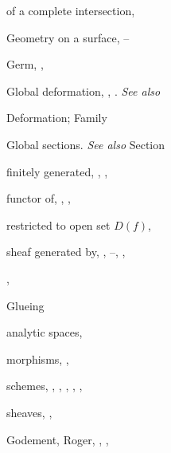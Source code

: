 {{\noindent\hspace*{7.5bp}of a complete intersection, \par
\noindent\hspace*{0.0bp}Geometry on a surface, --\par
\noindent\hspace*{0.0bp}Germ, , \par
\noindent\hspace*{0.0bp}Global deformation, , . \emph{See also}\par
\noindent\hspace*{15.0bp}Deformation; Family\par
\noindent\hspace*{0.0bp}Global sections. \emph{See also} Section\par
\noindent\hspace*{7.5bp}finitely generated, , , \par
\noindent\hspace*{7.5bp}functor of, , , \par
\noindent\hspace*{7.5bp}restricted to open set $D(f)$, \par
\noindent\hspace*{7.5bp}sheaf generated by, , --, ,\par
\noindent\hspace*{15.0bp}, \par
\noindent\hspace*{0.0bp}Glueing\par
\noindent\hspace*{7.5bp}analytic spaces, \par
\noindent\hspace*{7.5bp}morphisms, , \par
\noindent\hspace*{7.5bp}schemes, , , , , , \par
\noindent\hspace*{7.5bp}sheaves, , \par
\noindent\hspace*{0.0bp}Godement, Roger, , , \par
}}
